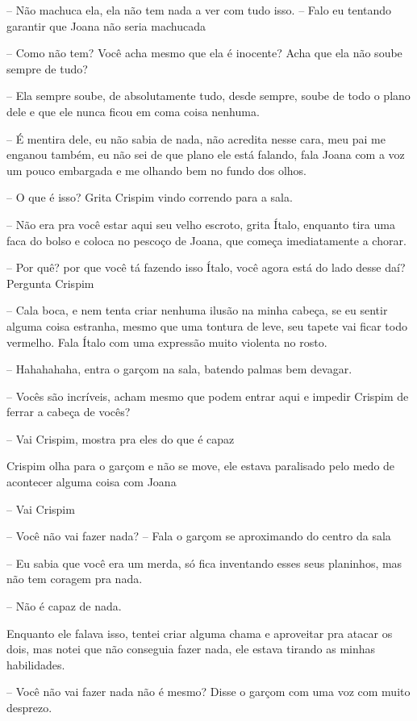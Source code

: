 -- Não machuca ela, ela não tem nada a ver com tudo isso. -- Falo eu tentando garantir que Joana não seria machucada

-- Como não tem? Você acha mesmo que ela é inocente? Acha que ela não soube sempre de tudo?

-- Ela sempre soube, de absolutamente tudo, desde sempre, soube de todo o plano dele e que ele nunca ficou em coma coisa nenhuma.

-- É mentira dele, eu não sabia de nada, não acredita nesse cara, meu pai me enganou também, eu não sei de que plano ele está falando, fala Joana com a voz um pouco embargada e me olhando bem no fundo dos olhos.

-- O que é isso? Grita Crispim vindo correndo para a sala.

-- Não era pra você estar aqui seu velho escroto, grita Ítalo, enquanto tira uma faca do bolso e coloca no pescoço de Joana, que começa imediatamente a chorar.

-- Por quê? por que você tá fazendo isso Ítalo, você agora está do lado desse daí? Pergunta Crispim

-- Cala boca, e nem tenta criar nenhuma ilusão na minha cabeça, se eu sentir alguma coisa estranha, mesmo que uma tontura de leve, seu tapete vai ficar todo vermelho. Fala Ítalo com uma expressão muito violenta no rosto.

-- Hahahahaha, entra o garçom na sala, batendo palmas bem devagar.

-- Vocês são incríveis, acham mesmo que podem entrar aqui e impedir Crispim de ferrar a cabeça de vocês?

-- Vai Crispim, mostra pra eles do que é capaz

Crispim olha para o garçom e não se move, ele estava paralisado pelo medo de acontecer alguma coisa com Joana

-- Vai Crispim

-- Você não vai fazer nada? -- Fala o garçom se aproximando do centro da sala

-- Eu sabia que você era um merda, só fica inventando esses seus planinhos, mas não tem coragem pra nada.

-- Não é capaz de nada.

Enquanto ele falava isso, tentei criar alguma chama e aproveitar pra atacar os dois, mas notei que não conseguia fazer nada, ele estava tirando as minhas habilidades. 

-- Você não vai fazer nada não é mesmo? Disse o garçom com uma voz com muito desprezo.

